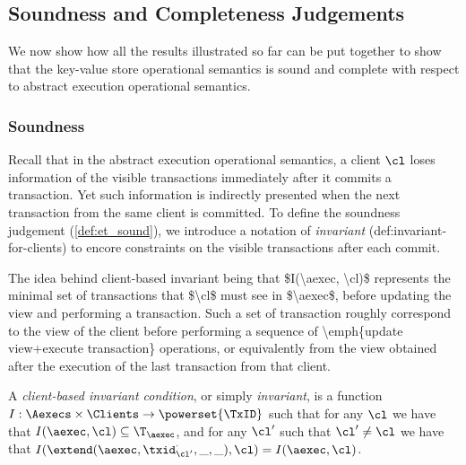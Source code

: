 \subsection{Soundness and Completeness Judgements}
\label{sec:kv2aexec-sound-complete}

We now show how all the results illustrated so far 
can be put together to show that the key-value store operational semantics 
is sound and complete with respect to abstract execution operational semantics.

\subsubsection{Soundness}
Recall that in the abstract execution operational semantics,
a client \( \cl \) loses information of the visible transactions immediately after it commits a transaction.
Yet such information is indirectly presented when the next transaction from the same client is committed.
To define the soundness judgement (\cref{def:et_sound}), we introduce a notation of \emph{invariant} ({def:invariant-for-clients})
to encore constraints on the visible transactions after each commit.

\ac{The idea behind client-based invariant being that $I(\aexec, \cl)$ represents 
the minimal set of transactions that $\cl$ must see in $\aexec$, before 
updating the view and performing a transaction. Such a set of transaction 
roughly correspond to the view of the client before performing a 
sequence of \emph{update view+execute transaction} operations, 
or equivalently from the view obtained after the execution of the 
last transaction from that client.}

\begin{definition}
\label{def:invariant-for-clients}
A \emph{client-based invariant condition}, or simply \emph{invariant}, is a 
function $I : \Aexecs \times \Clients \rightarrow \powerset{\TxID}$ 
such that for any $\cl$ we have that $I(\aexec, \cl) \subseteq \T_{\aexec}$, and 
for any  $\cl'$ such that $\cl' \neq \cl$ we have that 
$I(\extend(\aexec, \txid_{\cl'}^{\cdot}, \_, \_), \cl) = I(\aexec, \cl)$.
\end{definition}



